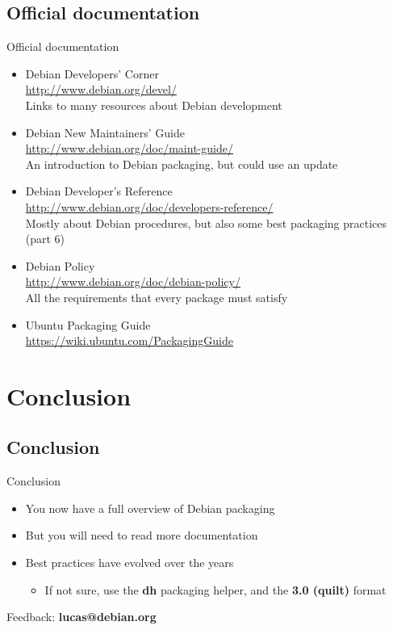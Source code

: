 \documentclass[10pt,final]{beamer}
\begin{document}
\subsection{Official documentation}
\begin{frame}{Official documentation}
	\begin{itemize}
		\item Debian Developers' Corner\\
			\url{http://www.debian.org/devel/}\\
			{\small Links to many resources about Debian development}
			\br
		\item Debian New Maintainers' Guide\\
			\url{http://www.debian.org/doc/maint-guide/}\\
			{\small An introduction to Debian packaging, but could use an update}
			\br
		\item Debian Developer's Reference\\
		      \url{http://www.debian.org/doc/developers-reference/}\\
		      {\small Mostly about Debian procedures, but also some best packaging practices (part 6)}
			\br
	      \item Debian Policy\\
		    \url{http://www.debian.org/doc/debian-policy/}\\
		    {\small All the requirements that every package must satisfy}
			\br

		\item Ubuntu Packaging Guide\\
			\url{https://wiki.ubuntu.com/PackagingGuide}
	\end{itemize}
\end{frame}

\section{Conclusion}
\subsection{Conclusion}
\begin{frame}{Conclusion}
\begin{itemize}
	\item You now have a full overview of Debian packaging
		\br
	\item But you will need to read more documentation
		\br
	\item Best practices have evolved over the years
		\begin{itemize}
			\item If not sure, use the \textbf{dh} packaging helper, and the \textbf{3.0 (quilt)} format
		\end{itemize}
\end{itemize}
\vfill
\centerline{\large Feedback: \textbf{lucas@debian.org}}
\end{frame}
\end{document}
